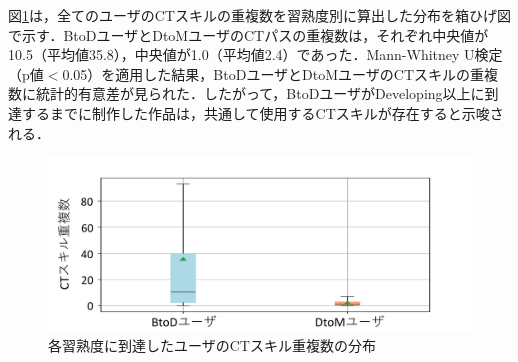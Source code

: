 \documentclass[submit]{ipsj}
\begin{document}
図\ref{fig:dupli-mean}は，全てのユーザのCTスキルの重複数を習熟度別に算出した分布を箱ひげ図で示す．BtoDユーザとDtoMユーザのCTパスの重複数は，それぞれ中央値が10.5（平均値35.8），中央値が1.0（平均値2.4）であった．Mann-Whitney U検定（p値$<$0.05）を適用した結果，BtoDユーザとDtoMユーザのCTスキルの重複数に統計的有意差が見られた．したがって，BtoDユーザがDeveloping以上に到達するまでに制作した作品は，共通して使用するCTスキルが存在すると示唆される．


\begin{figure}[t]
	\centering
	\includegraphics[width=0.8\linewidth]{Okamoto_fig/dupli-all.pdf}
	\caption{各習熟度に到達したユーザのCTスキル重複数の分布}
	\label{fig:dupli-mean}
 \vspace{-2mm}
\end{figure}

\end{document}
